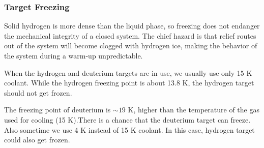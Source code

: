 \subsubsection{Target Freezing}

\begin{safetyen}{10}{5}
Solid hydrogen is more dense than the liquid phase, so freezing does not
endanger the mechanical integrity of a closed system. The chief hazard is that
relief routes out of the system will become clogged with hydrogen ice,
making the behavior of the system during a warm-up unpredictable.
\end{safetyen} 
When the hydrogen and deuterium targets are in use,
we usually use only 15 K coolant. While the hydrogen freezing point
is about 13.8 K, the hydrogen target should not get frozen. 
\begin{safetyen}{10}{5}
The freezing point of deuterium is $\sim 19$ K, higher than the temperature of 
the gas used for
cooling (15 K).There is 
a chance that the deuterium target can freeze. Also sometime we use 4 K
instead of 15 K coolant. In this case, hydrogen target could also get frozen.
\end{safetyen}

